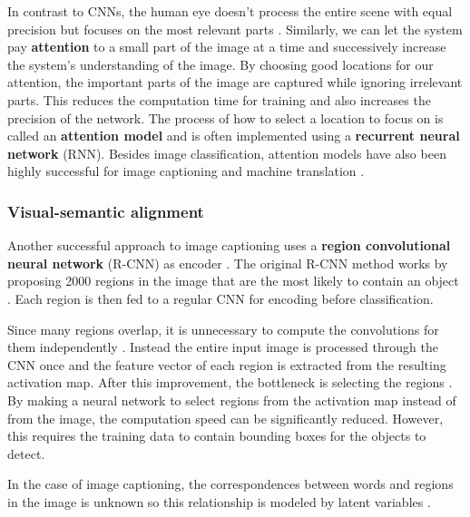 In contrast to CNNs, the human eye doesn't process the entire scene with equal precision but focuses on the most relevant parts \cite{DeepMindAttention}.
Similarly, we can let the system pay \textbf{attention} to a small part of the image at a time and successively increase the system's understanding of the image.
By choosing good locations for our attention, the important parts of the image are captured while ignoring irrelevant parts.
This reduces the computation time for training and also increases the precision of the network. The process of how to select a location to focus on is called an \textbf{attention model} and is often implemented using a \textbf{recurrent neural network} (RNN). Besides image classification, attention models have also been highly successful for image captioning \cite{AttendAndTell} and machine translation \cite{machine_translation_attention}.

\subsubsection{Visual-semantic alignment}


Another successful approach to image captioning uses a \textbf{region convolutional neural network} (R-CNN) as encoder \cite{VisualSemanticAlignment}.
The original R-CNN method works by proposing 2000 regions in the image that are the most likely to contain an object \cite{RCNN}. Each region is then fed to a regular CNN for encoding before classification.

Since many regions overlap, it is unnecessary to compute the convolutions for them independently \cite{FastRCNN}. Instead the entire input image is processed through the CNN once and the feature vector of each region is extracted from the resulting activation map. After this improvement, the bottleneck is selecting the regions \cite{FasterRCNN}. By making a neural network to select regions from the activation map instead of from the image, the computation speed can be significantly reduced. However, this requires the training data to contain bounding boxes for the objects to detect.

In the case of image captioning, the correspondences between words and regions in the image is unknown so this relationship is modeled by latent variables \cite{VisualSemanticAlignment}.
